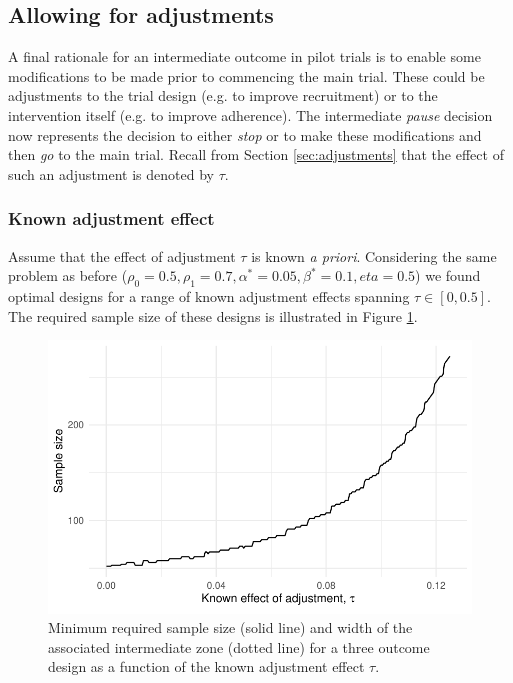 \documentclass{bmcart}
\begin{document}
\subsection{Allowing for adjustments}

A final rationale for an intermediate outcome in pilot trials is to enable some modifications to be made prior to commencing the main trial. These could be adjustments to the trial design (e.g. to improve recruitment) or to the intervention itself (e.g. to improve adherence). The intermediate \emph{pause} decision now represents the decision to either \emph{stop} or to make these modifications and then \emph{go} to the main trial. Recall from Section \ref{sec:adjustments} that the effect of such an adjustment is denoted by $\tau$.

\subsubsection{Known adjustment effect}

Assume that the effect of adjustment $\tau$ is known \emph{a priori}. Considering the same problem as before ($\rho_0 = 0.5, \rho_1 = 0.7, \alpha^* = 0.05, \beta^* = 0.1, eta = 0.5$) we found optimal designs for a range of known adjustment effects spanning $\tau \in [0, 0.5]$. The required sample size of these designs is illustrated in Figure \ref{fig:tau_ns}. 

\begin{figure}
\centering
\includegraphics[scale=0.8]{./figures/tau_ns}
\caption{Minimum required sample size (solid line) and width of the associated intermediate zone (dotted line) for a three outcome design as a function of the known adjustment effect $\tau$.}
\label{fig:tau_ns}
\end{figure}
\end{document}
